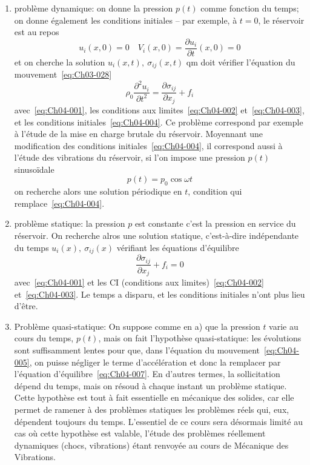 \begin{enumerate}
    \item problème dynamique: on  donne  la pression  $p(t)$  comme  fonction  du  temps; on  donne  également les  conditions  initiales  -- par  exemple,  à  $t=0$,  le réservoir est au repos
        \begin{equation}
            u_i(x,0)=0 \quad V_i(x,0) = \frac{\partial u_i}{\partial t}(x,0) = 0
            \label{eq:Ch04-004}
        \end{equation}
        et on cherche la solution $u_i(x,t),\ \sigma_{ij}(x,t)$ qm doit vérifier l'équation du mouvement~\eqref{eq:Ch03-028}
        \begin{equation}
            \rho_0 \frac{\partial^2 u_i}{\partial t^2} = \frac{\partial \sigma_{ij}}{\partial x_j} + f_i
            \label{eq:Ch04-005}
        \end{equation}
        avec~\eqref{eq:Ch04-001}, les conditions aux limites~\eqref{eq:Ch04-002} et~\eqref{eq:Ch04-003}, et les conditions initiales~\eqref{eq:Ch04-004}.
        Ce problème correspond par exemple à l'étude de la mise en charge brutale du réservoir.
        Moyennant une modification des conditions initiales~\eqref{eq:Ch04-004}, il correspond aussi à l'étude des vibrations du réservoir, si l'on impose une pression $p(t)$ sinusoïdale
        \begin{equation}
            p(t) = p_0 \cos \omega t
            \label{eq:Ch04-006}
        \end{equation}
        on recherche alors une solution périodique en $t$, condition qui remplace~\eqref{eq:Ch04-004}.
    \item problème statique: la pression $p$ est constante c'est la pression en service du réservoir.
        On recherche alros une solution statique, c'est-à-dire indépendante du temps $u_i(x),\ \sigma_{ij}(x)$ vérifiant les équations d'équilibre
        \begin{equation}
            \frac{\partial \sigma_{ij}}{\partial x_j} +f_i = 0
            \label{eq:Ch04-007}
        \end{equation}
        avec~\eqref{eq:Ch04-001} et les CI (conditions aux limites)~\eqref{eq:Ch04-002} et~\eqref{eq:Ch04-003}.
        Le temps a disparu, et les conditions initiales n'ont plus lieu d'être.
    \item Problème quasi-statique: On suppose comme en a) que la pression $t$ varie au cours du temps, $p(t)$, mais on fait l'hypothèse quasi-statique: les évolutions sont suffisamment lentes pour que, dans l'équation du mouvement~\eqref{eq:Ch04-005}, on puisse négliger le terme d'accélération et donc la remplacer par l'équation d'équilibre~\eqref{eq:Ch04-007}. En d'autres termes, la sollicitation dépend du temps, mais on résoud à chaque instant un problème statique. Cette hypothèse est tout à fait essentielle en mécanique des solides, car elle permet de ramener à des problèmes statiques les problèmes réels qui, eux, dépendent toujours du temps. L'essentiel de ce cours sera désormais limité au cas où cette hypothèse est valable, l'étude des problèmes réellement dynamiques (chocs, vibrations) étant renvoyée au cours de Mécanique des Vibrations.
\end{enumerate}
